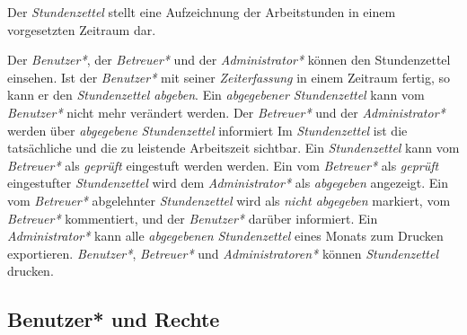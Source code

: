 \begin{requirements}
    Der \emph{Stundenzettel} stellt eine Aufzeichnung der Arbeitstunden in einem vorgesetzten Zeitraum dar.
    \begin{requirements}
         Der \emph{Benutzer*}, der \emph{Betreuer*} und der \emph{Administrator*} können den Stundenzettel einsehen.
         Ist der \emph{Benutzer*} mit seiner \emph{Zeiterfassung} in einem Zeitraum fertig, so kann er den \emph{Stundenzettel abgeben}.
         Ein \emph{abgegebener Stundenzettel} kann vom \emph{Benutzer*} nicht mehr verändert werden.
         Der \emph{Betreuer*} und der \emph{Administrator*} werden über \emph{abgegebene Stundenzettel} informiert
         Im \emph{Stundenzettel} ist die tatsächliche und die zu leistende Arbeitszeit sichtbar.
         Ein \emph{Stundenzettel} kann vom \emph{Betreuer*} als \emph{geprüft} eingestuft werden werden.
         Ein vom \emph{Betreuer*} als \emph{geprüft} eingestufter \emph{Stundenzettel} wird dem \emph{Administrator*} als \emph{abgegeben} angezeigt.
         Ein vom \emph{Betreuer*} abgelehnter \emph{Stundenzettel} wird als \emph{nicht abgegeben} markiert, vom \emph{Betreuer*} kommentiert, und der \emph{Benutzer*} darüber informiert.
         Ein \emph{Administrator*} kann alle \emph{abgegebenen Stundenzettel} eines Monats zum Drucken exportieren.
        \emph{Benutzer*}, \emph{Betreuer*} und \emph{Administratoren*} können \emph{Stundenzettel} drucken.
    \end{requirements}

\end{requirements}

\subsection{Benutzer* und Rechte}

